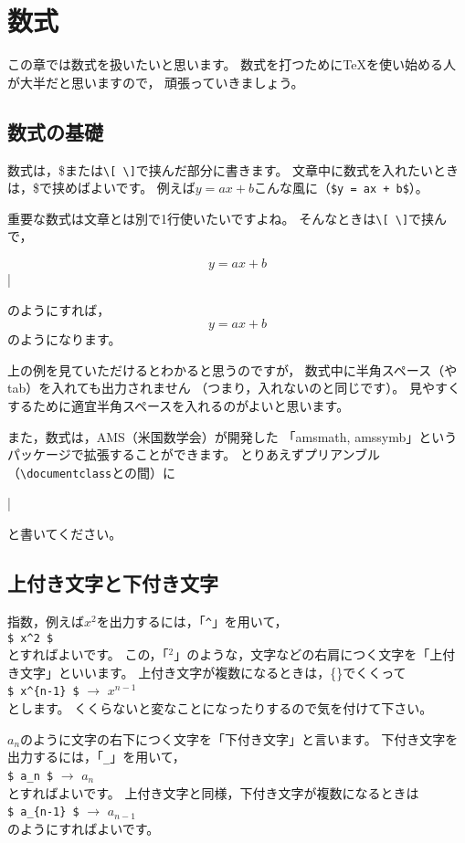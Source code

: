 \chapter{数式}
\label{ch:formulas}
この章では数式を扱いたいと思います。
数式を打つために{\TeX}を使い始める人が大半だと思いますので，
頑張っていきましょう。



\section{数式の基礎}
数式は，{\$}または\verb|\[ \]|で挟んだ部分に書きます。
文章中に数式を入れたいときは，{\$}で挟めばよいです。
例えば$y = ax + b$こんな風に（\verb|$y = ax + b$|）。

重要な数式は文章とは別で1行使いたいですよね。
そんなときは\verb|\[ \]|で挟んで，
\begin{ITeX}
\[ y = ax + b \]|
\end{ITeX}
のようにすれば，
\[ y = ax + b \]
のようになります。

上の例を見ていただけるとわかると思うのですが，
数式中に半角スペース（やtab）を入れても出力されません
（つまり，入れないのと同じです）。
見やすくするために適宜半角スペースを入れるのがよいと思います。

また，数式は，AMS（米国数学会）が開発した
「amsmath, amssymb」というパッケージで拡張することができます。
とりあえずプリアンブル（\verb|\documentclass|と\verb||の間）に
\begin{ITeX}
\usepackage{amsmath, amssymb}|
\end{ITeX}
と書いてください。



\section{上付き文字と下付き文字}
指数，例えば$x^2$を出力するには，「\verb|^|」を用いて，\\
\hspace{5zw} \verb|$ x^2 $| \\
とすればよいです。
この，「${}^{2}$」のような，文字などの右肩につく文字を「上付き文字」といいます。
上付き文字が複数になるときは，\{\}でくくって \\
\hspace{5zw} \verb|$ x^{n-1} $| $\rightarrow$ $x^{n-1}$ \\
とします。
くくらないと変なことになったりするので気を付けて下さい。

$a_n$のように文字の右下につく文字を「下付き文字」と言います。
下付き文字を出力するには，「\verb|_|」を用いて，\\
\hspace{5zw} \verb|$ a_n $| $\rightarrow$ $a_n$ \\
とすればよいです。
上付き文字と同様，下付き文字が複数になるときは \\
\hspace{5zw} \verb|$ a_{n-1} $| $\rightarrow$ $a_{n-1}$ \\
のようにすればよいです。

